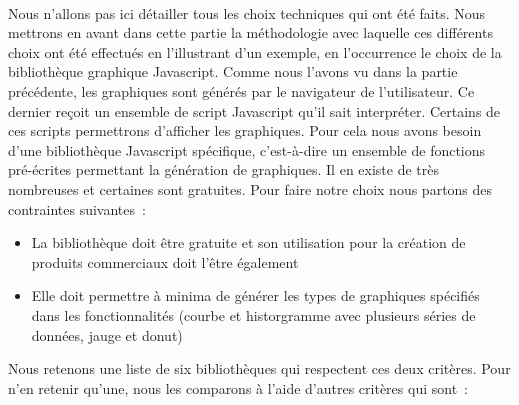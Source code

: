 			\paragraph{}%
			Nous n'allons pas ici détailler tous les choix techniques qui ont été faits.
			Nous mettrons en avant dans cette partie la méthodologie avec laquelle ces
			différents choix ont été effectués en l'illustrant d'un exemple, en
			l'occurrence le choix de la bibliothèque graphique Javascript. Comme nous
			l'avons vu dans la partie précédente, les graphiques sont
			générés par le navigateur de l'utilisateur. Ce dernier reçoit un ensemble
			de script Javascript qu'il sait interpréter. Certains de ces scripts
			permettrons d'afficher les graphiques. Pour cela nous avons besoin d'une
			bibliothèque Javascript spécifique, c'est-à-dire un ensemble de fonctions
			pré-écrites permettant la génération de graphiques.
			Il en existe de très nombreuses et certaines sont gratuites. Pour
			faire notre choix nous partons des contraintes suivantes~:
			\begin{itemize}
			  \item La bibliothèque doit être gratuite et son utilisation pour la
			  création de produits commerciaux doit l'être également
			  \item Elle doit permettre à minima de générer les types de graphiques
			  spécifiés dans les fonctionnalités (courbe et historgramme avec plusieurs
			  séries de données, jauge et donut)
			\end{itemize}
			Nous retenons une liste de six bibliothèques qui respectent ces deux
			critères.
			Pour n'en retenir qu'une, nous les comparons à l'aide d'autres critères qui
			sont~:
